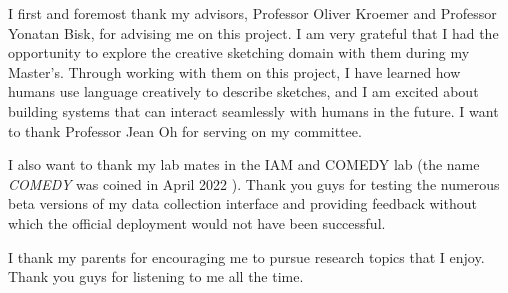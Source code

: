 I first and foremost thank my advisors, Professor Oliver Kroemer and Professor Yonatan Bisk, for advising me on this project. I am very grateful that I had the opportunity to explore the creative sketching domain with them during my Master's. 
Through working with them on this project, I have learned how humans use language creatively to describe sketches, and I am excited about building systems that can interact seamlessly with humans in the future. I want to thank Professor Jean Oh for serving on my committee. 

I also want to thank my lab mates in the IAM and COMEDY lab (the name \textit{COMEDY} was coined in April 2022 ). Thank you guys for testing the numerous beta versions of my data collection interface and providing feedback without which the official deployment would not have been successful. 

I thank my parents for encouraging me to pursue research topics that I enjoy. Thank you guys for listening to me all the time.

